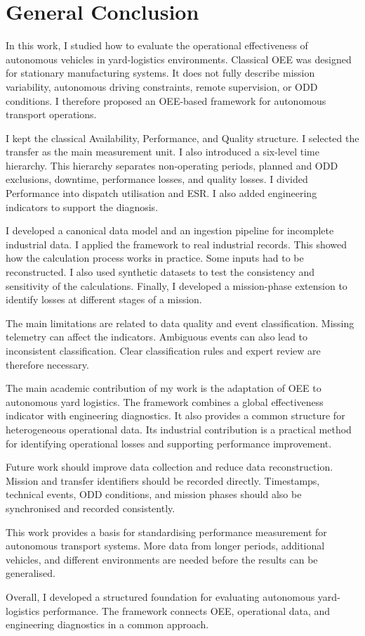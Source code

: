 \chapter*{General Conclusion}

In this work, I studied how to evaluate the operational effectiveness of autonomous vehicles in yard-logistics environments. Classical OEE was designed for stationary manufacturing systems. It does not fully describe mission variability, autonomous driving constraints, remote supervision, or ODD conditions. I therefore proposed an OEE-based framework for autonomous transport operations.

I kept the classical Availability, Performance, and Quality structure. I selected the transfer as the main measurement unit. I also introduced a six-level time hierarchy. This hierarchy separates non-operating periods, planned and ODD exclusions, downtime, performance losses, and quality losses. I divided Performance into dispatch utilisation and ESR. I also added engineering indicators to support the diagnosis.

I developed a canonical data model and an ingestion pipeline for incomplete industrial data. I applied the framework to real industrial records. This showed how the calculation process works in practice. Some inputs had to be reconstructed. I also used synthetic datasets to test the consistency and sensitivity of the calculations. Finally, I developed a mission-phase extension to identify losses at different stages of a mission.

The main limitations are related to data quality and event classification. Missing telemetry can affect the indicators. Ambiguous events can also lead to inconsistent classification. Clear classification rules and expert review are therefore necessary.

The main academic contribution of my work is the adaptation of OEE to autonomous yard logistics. The framework combines a global effectiveness indicator with engineering diagnostics. It also provides a common structure for heterogeneous operational data. Its industrial contribution is a practical method for identifying operational losses and supporting performance improvement.

Future work should improve data collection and reduce data reconstruction. Mission and transfer identifiers should be recorded directly. Timestamps, technical events, ODD conditions, and mission phases should also be synchronised and recorded consistently.

This work provides a basis for standardising performance measurement for autonomous transport systems. More data from longer periods, additional vehicles, and different environments are needed before the results can be generalised.

Overall, I developed a structured foundation for evaluating autonomous yard-logistics performance. The framework connects OEE, operational data, and engineering diagnostics in a common approach.
